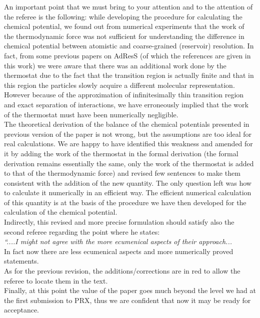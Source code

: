 \documentclass[12pt,a4paper]{article}
\begin{document}
An important point that we must bring to your attention and to the attention of the referee is the following: while developing the procedure for calculating the chemical potential, we found out from numerical experiments that the work of the thermodynamic force was not sufficient for understanding the difference in chemical potential between atomistic and coarse-grained (reservoir) resolution. In fact, from some previous papers on AdResS (of which the references are given in this work)  we were aware that there was an additional work done by the thermostat  due to the fact that the transition region is actually finite and that in this region the particles slowly acquire a different molecular representation. However because of the approximation of infinitesimally thin transition region and exact separation of interactions, we have erroneously implied that the work of the thermostat must have been numerically negligible.\\
The theoretical derivation of the balance of the chemical potentials presented in previous version of the paper is not wrong, but the assumptions are too ideal for real calculations. We are happy to have identified this weakness and amended for it by adding the work of the thermostat in the formal derivation (the formal derivation remains essentially the same, only the work of the thermostat is added to that of the thermodynamic force) and revised few sentences to make them consistent with the addition of the new quantity. The only question left was how to calculate it numerically in an efficient way. The efficient numerical calculation of this quantity  is at the basis of the procedure we have then developed for the calculation of the chemical potential.\\
Indirectly, this revised and more precise formulation should satisfy also the second referee regarding the point where he states:\\
{\it ``....I might not agree with the more ecumenical
aspects of their approach...}\\
In fact now there are less ecumenical aspects and more numerically proved statements.\\

As for the previous revision, the additions/corrections are in red to allow the referee to locate them in the text.\\

Finally, at this point the value of the paper goes much beyond the level we had at the first submission to PRX, thus we are confident that now it may be ready for acceptance.\\
\end{document}
